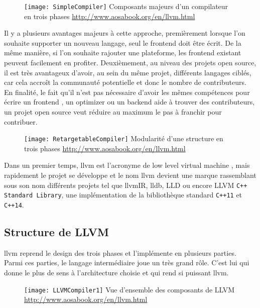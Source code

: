 \begin{figure}[H]
	\centering
	\texttt{[image: SimpleCompiler]}
	{Composants majeurs d'un compilateur en trois phases}
	{\url{http://www.aosabook.org/en/llvm.html}}
	\label{fig:SimpleCompiler}
\end{figure}

Il y a plusieurs avantages majeurs à cette approche, premièrement lorsque l'on souhaite supporter un nouveau langage, seul le \og frontend \fg doit être écrit. De la même manière, si l'on souhaite rajouter une plateforme, les \og frontend \fg existant peuvent facilement en profiter. Deuxièmement, au niveau des projets open source, il est très avantageux d'avoir, au sein du même projet, différents langages ciblés, car cela accroît la communauté potentielle et donc le nombre de contributeurs. En finalité, le fait qu'il n'est pas nécessaire d'avoir les mêmes compétences pour écrire un \og frontend \fg, un \og optimizer \fg ou un \og backend \fg aide à trouver des contributeurs, un projet open source veut réduire au maximum le pas à franchir pour contribuer.

\begin{figure}[H]
	\centering
	\texttt{[image: RetargetableCompiler]}
	{Modularité d'une structure en trois phases}
	{\url{http://www.aosabook.org/en/llvm.html}}
	\label{fig:RetargetableCompiler}
\end{figure}

Dans un premier temps, \gls{llvm} est l'acronyme de \og low level virtual machine \fg, mais rapidement le projet se développe et le nom \gls{llvm} devient une marque rassemblant sous son nom différents projets tel que \gls{llvmIR}, \gls{lldb}, LLD ou encore LLVM \texttt{C++ Standard Library}, une implémentation de la bibliothèque standard \texttt{C++11} et \texttt{C++14}.

\subsection{Structure de LLVM}

\gls{llvm} reprend le design des trois phases et l'implémente en plusieurs parties. Parmi ces parties, le langage intermédiaire joue un très grand rôle. C'est lui qui donne le plus de sens à l'architecture choisie et qui rend si puissant \gls{llvm}.

\begin{figure}[H]
	\centering
	\texttt{[image: LLVMCompiler1]}
	{Vue d'ensemble des composants de LLVM}
	{\url{http://www.aosabook.org/en/llvm.html}}
	\label{fig:LLVMCompiler1}
\end{figure}

